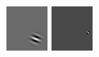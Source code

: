 \documentclass[a4paper,10pt]{article}
\begin{document}
\begin{figure}[ht]
 \includegraphics[width=\textwidth*11/100]{figures/firstgabor_Full_3.png}
 \includegraphics[width=\textwidth*11/100]{figures/firstgabor_Full_4.png}

\end{figure}
\end{document}
